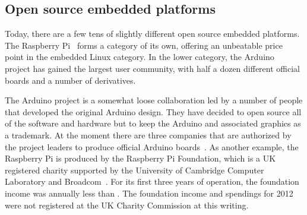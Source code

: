 \documentclass{siamltex}
\begin{document}


\subsection{Open source embedded platforms}
\label{ssec:platforms}

Today, there are a few tens of slightly different open source embedded
platforms.  The Raspberry Pi~\cite{RasPi} forms a category of its own,
offering an unbeatable price point in the embedded Linux category.  In
the lower category, the Arduino~\cite{ArduinoProject,hribernik2011co}
project has gained the largest user community, with half a dozen
different official boards and a number of derivatives.

The Arduino project is a somewhat loose collaboration led by a number of
people that developed the original Arduino design.  They have decided
to open source all of the software and hardware but to keep the
Arduino and associated graphics as a trademark.  At the moment there are
three companies that are authorized by the project leaders to produce
official Arduino boards~\cite{ArduinoPolicy}.  
As another example,
the Raspberry Pi is produced by the Raspberry Pi Foundation, which is
a UK registered charity 
supported by the University of Cambridge Computer
Laboratory and Broadcom~\cite{RaspiFoundationWikipedia}.  For its
first three years of operation, the foundation income was annually
less than .  The foundation income and spendings for 2012
were not registered at the UK Charity Commission at this writing.
\end{document}
